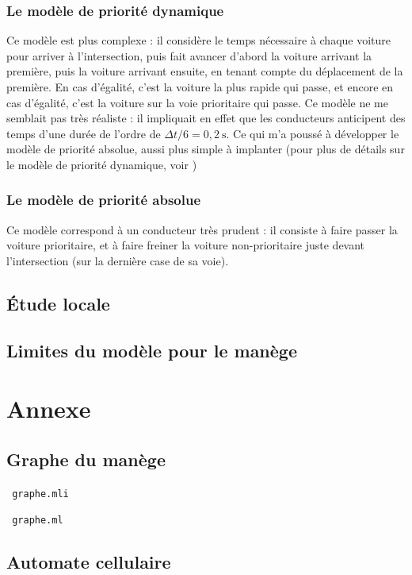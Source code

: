 \documentclass[10pt,draft]{article}
\begin{document}
		\subsubsection{Le modèle de priorité dynamique}
		Ce modèle est plus complexe : il considère le temps nécessaire à chaque voiture pour arriver à l'intersection, puis fait avancer d'abord la voiture arrivant la première, puis la voiture arrivant ensuite, en tenant compte du déplacement de la première. En cas d'égalité, c'est la voiture la plus rapide qui passe, et encore en cas d'égalité, c'est la voiture sur la voie prioritaire qui passe. Ce modèle ne me semblait pas très réaliste : il impliquait en effet que les conducteurs anticipent des temps d'une durée de l'ordre de $\Delta	t / 6 = 0,2 ~\mathrm{s}$. Ce qui m'a poussé à développer le modèle de priorité absolue, aussi plus simple à implanter (pour plus de détails sur le modèle de priorité dynamique, voir \cite{Chph})
		\subsubsection{Le modèle de priorité absolue}
		Ce modèle correspond à un conducteur très prudent : il consiste à faire passer la voiture prioritaire, et à faire freiner la voiture non-prioritaire juste devant l'intersection (sur la dernière case de sa voie).
		
	\subsection{Étude locale}	
	
	\subsection{Limites du modèle pour le manège}
	
\renewcommand{\refname}{Bibliographie}


	
	
\section{Annexe}
	\subsection{Graphe du manège}

\label{grmli}
\verb+ graphe.mli+


\verb+ graphe.ml+

	\subsection{Automate cellulaire}
\end{document}
